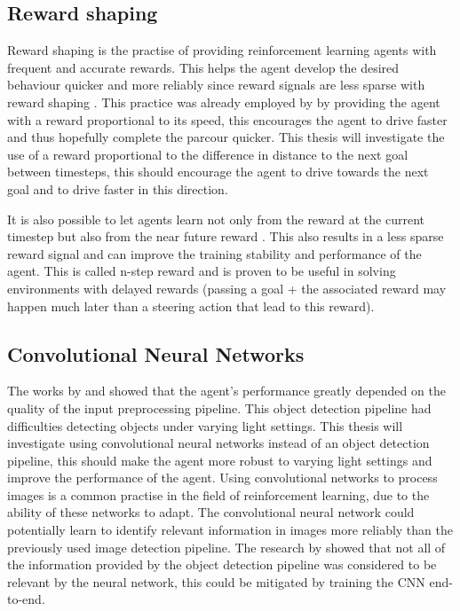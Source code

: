 \subsection{Reward shaping}

Reward shaping is the practise of providing reinforcement learning agents with frequent and accurate rewards. This helps the agent develop the desired behaviour quicker and more reliably since reward signals are less sparse with reward shaping \autocite{drl_for_ad}. This practice was already employed by \autocite{maximilian} by providing the agent with a reward proportional to its speed, this encourages the agent to drive faster and thus hopefully complete the parcour quicker. This thesis will investigate the use of a reward proportional to the difference in distance to the next goal between timesteps, this should encourage the agent to drive towards the next goal and to drive faster in this direction.

It is also possible to let agents learn not only from the reward at the current timestep but also from the near future reward \autocite{nstepreward}. This also results in a less sparse reward signal and can improve the training stability and performance of the agent. This is called n-step reward and is proven to be useful in solving environments with delayed rewards (passing a goal + the associated reward may happen much later than a steering action that lead to this reward).


\subsection{Convolutional Neural Networks}

The works by \autocite{merlin_flach} and \autocite{maximilian} showed that the agent's performance greatly depended on the quality of the input preprocessing pipeline. This object detection pipeline had difficulties detecting objects under varying light settings. This thesis will investigate using convolutional neural networks instead of an object detection pipeline, this should make the agent more robust to varying light settings and improve the performance of the agent. 
Using convolutional networks to process images is a common practise in the field of reinforcement learning, due to the ability of these networks to adapt. The convolutional neural network could potentially learn to identify relevant information in images more reliably than the previously used image detection pipeline. The research by \autocite{merlin_flach} showed that not all of the information provided by the object detection pipeline was considered to be relevant by the neural network, this could be mitigated by training the CNN end-to-end.

